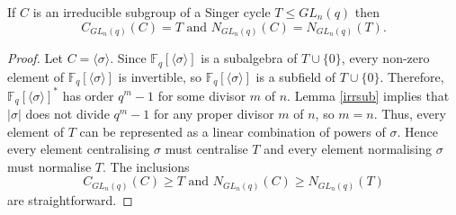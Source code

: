 \begin{Lem}
If $C$ is an irreducible subgroup of a Singer cycle $T \le GL_n(q)$ then $$C_{GL_n(q)}(C)=T \text{ and } N_{GL_n(q)}(C)=N_{GL_n(q)}(T).$$
\end{Lem}
\begin{proof}
Let $C= \langle \sigma \rangle.$  Since $\mathbb{F}_q[\langle \sigma \rangle]$ is a subalgebra of $T \cup \{0\}$, every non-zero element of $\mathbb{F}_q[\langle \sigma \rangle]$ is invertible, so $\mathbb{F}_q[\langle \sigma \rangle]$ is a subfield of $T \cup \{0\}$. Therefore, $\mathbb{F}_q[\langle \sigma \rangle]^*$ has order $q^m-1$ for some divisor $m$ of $n$. Lemma \ref{irrsub} implies that  $|\sigma|$ does not divide $q^m-1$ for any proper divisor $m$ of $n$, so $m=n.$ Thus, every element of $T$ can be represented as a linear combination of powers of $\sigma.$ Hence every element centralising $\sigma$ must centralise $T$ and every element normalising $\sigma$ must normalise $T.$ The inclusions 
$$C_{GL_n(q)}(C) \ge T \text{ and } N_{GL_n(q)}(C) \ge N_{GL_n(q)}(T)$$
are straightforward.
\end{proof}


